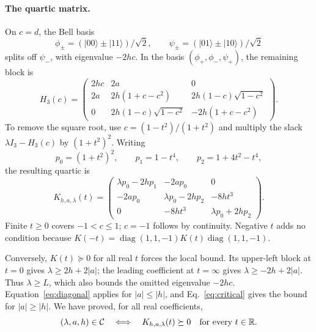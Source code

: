 \documentclass[11pt]{article}
\theoremstyle{remark}\newtheorem{remark}[theorem]{Remark}
\begin{document}
\paragraph{The quartic matrix.}
On \(c=d\), the Bell basis
\[
 \phi_\pm=(|00\rangle\pm|11\rangle)/\sqrt2,\qquad
 \psi_\pm=(|01\rangle\pm|10\rangle)/\sqrt2
\]
splits off \(\psi_-\), with eigenvalue \(-2hc\).
In the basis \((\phi_+,\phi_-,\psi_+)\), the remaining block is
\[
 H_3(c)=
 \begin{pmatrix}
 2hc&2a&0\\
 2a&2h(1+c-c^2)&2h(1-c)\sqrt{1-c^2}\\
 0&2h(1-c)\sqrt{1-c^2}&-2h(1+c-c^2)
 \end{pmatrix}.
\]
To remove the square root, use \(c=(1-t^2)/(1+t^2)\) and multiply
the slack $\lambda I_3-H_3(c)$ by \((1+t^2)^2\).
Writing
\[
 p_0=(1+t^2)^2,\qquad p_1=1-t^4,\qquad p_2=1+4t^2-t^4,
\]
the resulting quartic is
\begin{equation}
 K_{h,a,\lambda}(t)=
 \begin{pmatrix}
 \lambda p_0-2hp_1&-2ap_0&0\\
 -2ap_0&\lambda p_0-2hp_2&-8ht^3\\
 0&-8ht^3&\lambda p_0+2hp_2
 \end{pmatrix}.
 \label{eq:K}
\end{equation}
Finite \(t\ge0\) covers \(-1<c\le1\); \(c=-1\) follows by continuity.
Negative \(t\) adds no condition because
\(K(-t)=\operatorname{diag}(1,1,-1)K(t)\operatorname{diag}(1,1,-1)\).

Conversely, \(K(t)\succeq0\) for all real \(t\) forces the local bound.
Its upper-left block at \(t=0\) gives \(\lambda\ge2h+2|a|\);
the leading coefficient at \(t=\infty\) gives \(\lambda\ge-2h+2|a|\).
Thus \(\lambda\ge L\), which also bounds the omitted eigenvalue $-2hc$.
Equation~\eqref{eq:diagonal} applies for $|a|\le|h|$, and
Eq.~\eqref{eq:critical} gives the bound for $|a|\ge|h|$.
We have proved, for all real coefficients,
\begin{equation}
 (\lambda,a,h)\in{\cal C}
 \quad\Longleftrightarrow\quad
 K_{h,a,\lambda}(t)\succeq0\quad\text{for every }t\in\mathbb R .
 \label{eq:cone}
\end{equation}
\end{document}
